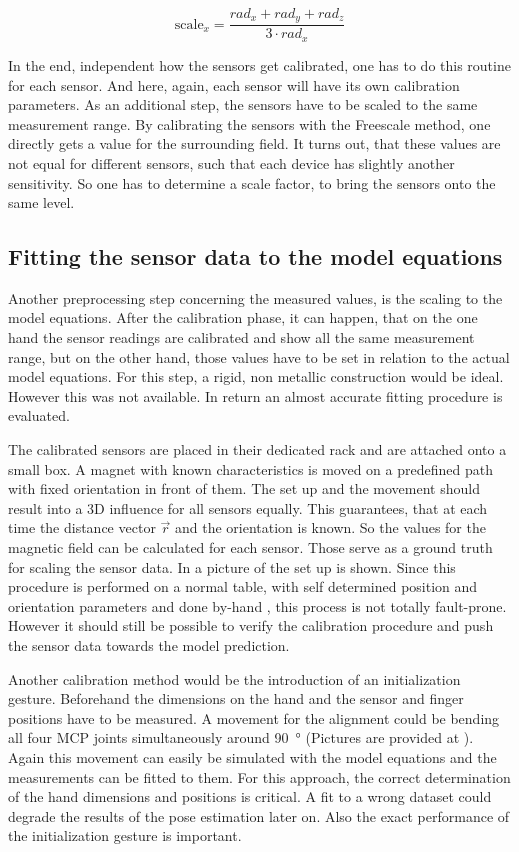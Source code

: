 \begin{equation} \label{eq:scaleX}
\mathrm{scale}_{x} = \frac{rad_{x}+rad_{y}+rad_{z}}{3 \cdot rad_{x}}
\end{equation}

In the end, independent how the sensors get calibrated, one has to do this routine for each sensor. And here, again, each sensor will have its own calibration parameters. As an additional step, the sensors have to be scaled to the same measurement range. By calibrating the sensors with the Freescale method, one directly gets a value for the surrounding field. It turns out, that these values are not equal for different sensors, such that each device has slightly another sensitivity. So one has to determine a scale factor, to bring the sensors onto the same level.


\subsection{Fitting the sensor data to the model equations}

Another preprocessing step concerning the measured values, is the scaling to the model equations. After the calibration phase, it can happen, that on the one hand the sensor readings are calibrated and show all the same measurement range, but on the other hand, those values have to be set in relation to the actual model equations. For this step, a rigid, non metallic construction would be ideal. However this was not available. In return an almost accurate fitting procedure is evaluated.

The calibrated sensors are placed in their dedicated rack and are attached onto a small box. A magnet with known characteristics is moved on a predefined path with fixed orientation in front of them. The set up and the movement should result into a 3D influence for all sensors equally. This guarantees, that at each time the distance vector $ \vec{r} $ and the orientation is known. So the values for the magnetic field can be calculated for each sensor. Those serve as a ground truth for scaling the sensor data. In  a picture of the set up is shown. Since this procedure is performed on a normal table, with self determined position and orientation parameters and done \grqq by-hand \grqq, this process is not totally fault-prone. However it should still be possible to verify the calibration procedure and push the sensor data towards the model prediction.

Another calibration method would be the introduction of an initialization gesture. Beforehand the dimensions on the hand and the sensor and finger positions have to be measured. A movement for the alignment could be bending all four \ac{MCP} joints simultaneously around \SI{90}{\degree} (Pictures are provided at ). Again this movement can easily be simulated with the model equations and the measurements can be fitted to them. For this approach, the correct determination of the hand dimensions and positions is critical. A fit to a wrong dataset could degrade the results of the pose estimation later on. Also the exact performance of the initialization gesture is important.


